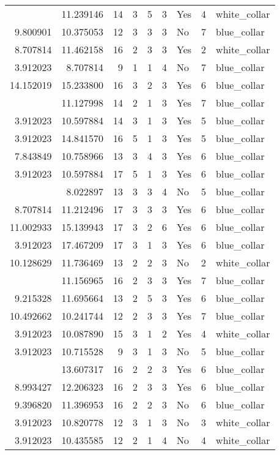 \documentclass[
]{article}
\begin{document}
\begin{longtable}[t]{rrrrrllrl}
\addlinespace
9.310186 & 11.239146 & 14 & 3 & 5 & 3 & Yes & 4 & white\_collar\\
9.800901 & 10.375053 & 12 & 3 & 3 & 3 & No & 7 & blue\_collar\\
8.707814 & 11.462158 & 16 & 2 & 3 & 3 & Yes & 2 & white\_collar\\
3.912023 & 8.707814 & 9 & 1 & 1 & 4 & No & 7 & blue\_collar\\
14.152019 & 15.233800 & 16 & 3 & 2 & 3 & Yes & 6 & blue\_collar\\
\addlinespace
3.912023 & 11.127998 & 14 & 2 & 1 & 3 & Yes & 7 & blue\_collar\\
3.912023 & 10.597884 & 14 & 3 & 1 & 3 & Yes & 5 & blue\_collar\\
3.912023 & 14.841570 & 16 & 5 & 1 & 3 & Yes & 5 & blue\_collar\\
7.843849 & 10.758966 & 13 & 3 & 4 & 3 & Yes & 6 & blue\_collar\\
3.912023 & 10.597884 & 17 & 5 & 1 & 3 & Yes & 6 & blue\_collar\\
\addlinespace
6.856462 & 8.022897 & 13 & 3 & 3 & 4 & No & 5 & blue\_collar\\
8.707814 & 11.212496 & 17 & 3 & 3 & 3 & Yes & 6 & blue\_collar\\
11.002933 & 15.139943 & 17 & 3 & 2 & 6 & Yes & 6 & blue\_collar\\
3.912023 & 17.467209 & 17 & 3 & 1 & 3 & Yes & 6 & blue\_collar\\
10.128629 & 11.736469 & 13 & 2 & 2 & 3 & No & 2 & white\_collar\\
\addlinespace
6.476972 & 11.156965 & 16 & 2 & 3 & 3 & Yes & 7 & blue\_collar\\
9.215328 & 11.695664 & 13 & 2 & 5 & 3 & Yes & 6 & blue\_collar\\
10.492662 & 10.241744 & 12 & 2 & 3 & 3 & Yes & 7 & blue\_collar\\
3.912023 & 10.087890 & 15 & 3 & 1 & 2 & Yes & 4 & white\_collar\\
3.912023 & 10.715528 & 9 & 3 & 1 & 3 & No & 5 & blue\_collar\\
\addlinespace
12.072827 & 13.607317 & 16 & 2 & 2 & 3 & Yes & 6 & blue\_collar\\
8.993427 & 12.206323 & 16 & 2 & 3 & 3 & Yes & 6 & blue\_collar\\
9.396820 & 11.396953 & 16 & 2 & 2 & 3 & No & 6 & blue\_collar\\
3.912023 & 10.820778 & 12 & 3 & 1 & 3 & No & 3 & white\_collar\\
3.912023 & 10.435585 & 12 & 2 & 1 & 4 & No & 4 & white\_collar\\

\end{longtable}
\end{document}
